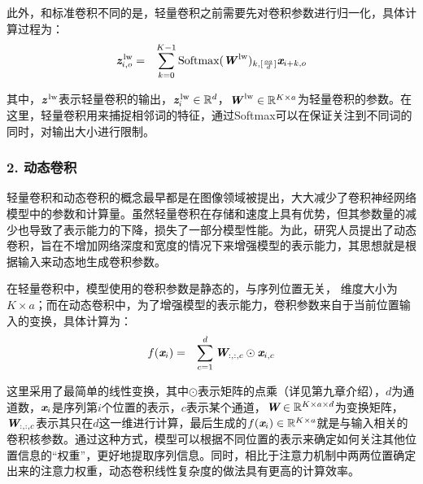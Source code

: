 \parinterval 此外，和标准卷积不同的是，轻量卷积之前需要先对卷积参数进行归一化，具体计算过程为：
\begin{eqnarray}
\textbf{\em z}_{i,o}^\textrm{\,lw} &=& \sum_{k=0}^{K-1} \textrm{Softmax}(\textbf{\em W}^\textrm{\,lw})_{k,[\frac{oa}{d}]} \textbf{\em x}_{i+k,o}
\label{eq:11-21}
\end{eqnarray}

\noindent 其中，$\textbf{\em z}^\textrm{\,lw}$表示轻量卷积的输出，$\textbf{\em z}_i^\textrm{\,lw} \in \mathbb{R}^d $，$\textbf{\em W}^\textrm{\,lw} \in \mathbb{R}^{K\times a}$为轻量卷积的参数。在这里，轻量卷积用来捕捉相邻词的特征，通过Softmax可以在保证关注到不同词的同时，对输出大小进行限制。

\subsubsection{2. 动态卷积}

\parinterval 轻量卷积和动态卷积的概念最早都是在图像领域被提出，大大减少了卷积神经网络模型中的参数和计算量。虽然轻量卷积在存储和速度上具有优势，但其参数量的减少也导致了表示能力的下降，损失了一部分模型性能。为此，研究人员提出了动态卷积，旨在不增加网络深度和宽度的情况下来增强模型的表示能力，其思想就是根据输入来动态地生成卷积参数。

\parinterval 在轻量卷积中，模型使用的卷积参数是静态的，与序列位置无关， 维度大小为$K\times a$；而在动态卷积中，为了增强模型的表示能力，卷积参数来自于当前位置输入的变换，具体计算为：
\begin{eqnarray}
{f} (\textbf{\em x}_{i}) &=& \sum_{c=1}^d \textbf{\em W}_{:,:,c} \odot \textbf{\em x}_{i,c}
\label{eq:11-22}
\end{eqnarray}

\parinterval 这里采用了最简单的线性变换，其中$\odot$表示矩阵的点乘（详见第九章介绍），$d$为通道数，$\textbf{\em x}_i$是序列第$i$个位置的表示，$c$表示某个通道，$\textbf{\em W} \in \mathbb{R}^{K \times a \times d}$为变换矩阵，$\textbf{\em W}_{:,:,c}$表示其只在$d$这一维进行计算，最后生成的${f} (\textbf{\em x}_i)\in \mathbb{R}^{K \times a}$就是与输入相关的卷积核参数。通过这种方式，模型可以根据不同位置的表示来确定如何关注其他位置信息的“权重”，更好地提取序列信息。同时，相比于注意力机制中两两位置确定出来的注意力权重，动态卷积线性复杂度的做法具有更高的计算效率。


